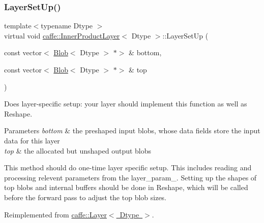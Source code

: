 \subsubsection{\texorpdfstring{Layer\+Set\+Up()}{LayerSetUp()}\hspace{0.1cm}{\footnotesize\ttfamily [2/2]}}
{\footnotesize\ttfamily template$<$typename Dtype $>$ \\
virtual void \mbox{\hyperlink{classcaffe_1_1_inner_product_layer}{caffe\+::\+Inner\+Product\+Layer}}$<$ Dtype $>$\+::Layer\+Set\+Up (\begin{DoxyParamCaption}\item[{const vector$<$ \mbox{\hyperlink{classcaffe_1_1_blob}{Blob}}$<$ Dtype $>$ $\ast$$>$ \&}]{bottom,  }\item[{const vector$<$ \mbox{\hyperlink{classcaffe_1_1_blob}{Blob}}$<$ Dtype $>$ $\ast$$>$ \&}]{top }\end{DoxyParamCaption})\hspace{0.3cm}{\ttfamily [virtual]}}



Does layer-\/specific setup\+: your layer should implement this function as well as Reshape. 


\begin{DoxyParams}{Parameters}
{\em bottom} & the preshaped input blobs, whose data fields store the input data for this layer \\
\hline
{\em top} & the allocated but unshaped output blobs\\
\hline
\end{DoxyParams}
This method should do one-\/time layer specific setup. This includes reading and processing relevent parameters from the {\ttfamily layer\+\_\+param\+\_\+}. Setting up the shapes of top blobs and internal buffers should be done in {\ttfamily Reshape}, which will be called before the forward pass to adjust the top blob sizes. 

Reimplemented from \mbox{\hyperlink{classcaffe_1_1_layer_a481323a3e0972c682787f2137468c29f}{caffe\+::\+Layer$<$ Dtype $>$}}.

\mbox{\label{classcaffe_1_1_inner_product_layer_a1c823624ec9286477db7caa5188152b8}} 
